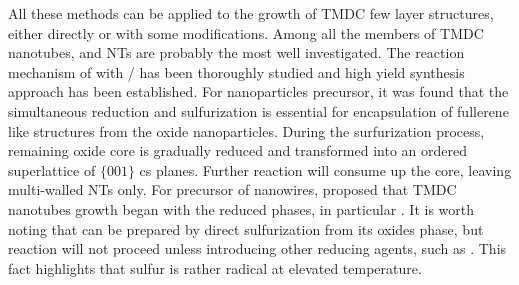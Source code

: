 All these methods can be applied to the growth of TMDC few layer structures, either directly or with some modifications. Among all the members of TMDC nanotubes,  and  NTs are probably the most well investigated.\cite{Homyonfer1997,Tenne1998,Frey1998,Frey1999,Rothschild2000,Zak2000} The reaction mechanism of  with / has been thoroughly studied \cite{Feldman1998} and high yield synthesis approach has been established.\cite{Margolin2004} For  nanoparticles precursor, it was found that the simultaneous reduction and sulfurization is essential for encapsulation of fullerene like  structures from the oxide nanoparticles. During the surfurization process, remaining oxide core is gradually reduced and transformed into an ordered superlattice of $\{ 001 \}$ \gls{cs} planes. Further reaction will consume up the  core, leaving multi-walled  NTs only. For precursor of  nanowires, \citeauthor{Feldman1996} proposed that TMDC nanotubes growth began with the reduced  phases, in particular .\cite{Feldman1996} It is worth noting that  can be prepared by direct sulfurization from its oxides phase, but reaction  will not proceed unless introducing other reducing agents, such as .\cite{Tsirlina1998} This fact highlights that sulfur is rather radical at elevated temperature.

